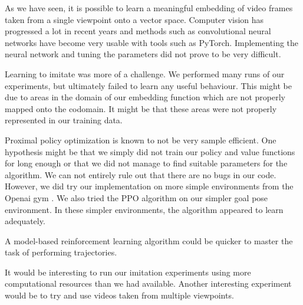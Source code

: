 
As we have seen, it is possible to learn a meaningful embedding of video frames taken from a single viewpoint onto a vector space. Computer vision has progressed a lot in recent years and methods such as convolutional neural networks have become very usable with tools such as PyTorch. Implementing the neural network and tuning the parameters did not prove to be very difficult.

Learning to imitate was more of a challenge. We performed many runs of our experiments, but ultimately failed to learn any useful behaviour. This might be due to areas in the domain of our embedding function which are not properly mapped onto the codomain. It might be that these areas were not properly represented in our training data.

Proximal policy optimization is known to not be very sample efficient. One hypothesis might be that we simply did not train our policy and value functions for long enough or that we did not manage to find suitable parameters for the algorithm. We can not entirely rule out that there are no bugs in our code. However, we did try our implementation on more simple environments from the Openai gym \citep{gym}. We also tried the PPO algorithm on our simpler goal pose environment. In these simpler environments, the algorithm appeared to learn adequately.

A model-based reinforcement learning algorithm could be quicker to master the task of performing trajectories.

It would be interesting to run our imitation experiments using more computational resources than we had available. Another interesting experiment would be to try and use videos taken from multiple viewpoints.


